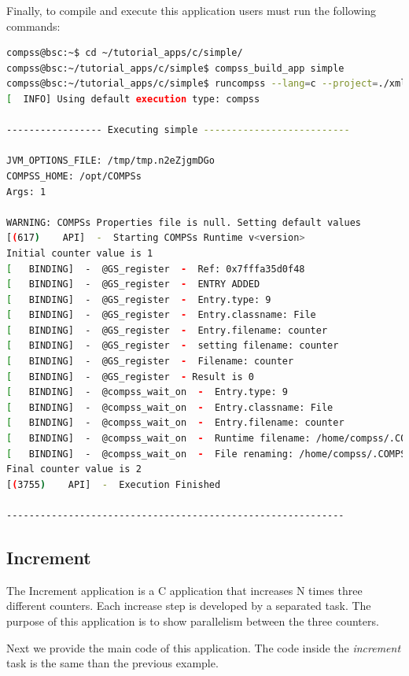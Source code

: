 Finally, to compile and execute this application users must run the following commands:

\begin{lstlisting}[language=bash]
compss@bsc:~$ cd ~/tutorial_apps/c/simple/
compss@bsc:~/tutorial_apps/c/simple$ compss_build_app simple
compss@bsc:~/tutorial_apps/c/simple$ runcompss --lang=c --project=./xml/project.xml --resources=./xml/resources.xml ~/tutorial_apps/c/simple/master/simple 1
[  INFO] Using default execution type: compss

----------------- Executing simple --------------------------

JVM_OPTIONS_FILE: /tmp/tmp.n2eZjgmDGo
COMPSS_HOME: /opt/COMPSs
Args: 1
 
WARNING: COMPSs Properties file is null. Setting default values
[(617)    API]  -  Starting COMPSs Runtime v<version>
Initial counter value is 1
[   BINDING]  -  @GS_register  -  Ref: 0x7fffa35d0f48
[   BINDING]  -  @GS_register  -  ENTRY ADDED
[   BINDING]  -  @GS_register  -  Entry.type: 9
[   BINDING]  -  @GS_register  -  Entry.classname: File
[   BINDING]  -  @GS_register  -  Entry.filename: counter
[   BINDING]  -  @GS_register  -  setting filename: counter
[   BINDING]  -  @GS_register  -  Filename: counter
[   BINDING]  -  @GS_register  - Result is 0
[   BINDING]  -  @compss_wait_on  -  Entry.type: 9
[   BINDING]  -  @compss_wait_on  -  Entry.classname: File
[   BINDING]  -  @compss_wait_on  -  Entry.filename: counter
[   BINDING]  -  @compss_wait_on  -  Runtime filename: /home/compss/.COMPSs/simple_01/tmpFiles/d1v2_1479141705574.IT
[   BINDING]  -  @compss_wait_on  -  File renaming: /home/compss/.COMPSs/simple_01/tmpFiles/d1v2_1479141705574.IT to counter
Final counter value is 2
[(3755)    API]  -  Execution Finished

------------------------------------------------------------
\end{lstlisting}


\subsection{Increment}
The Increment application is a C application that increases N times three different counters. Each increase step is developed by a separated task. The
purpose of this application is to show parallelism between the three counters.

Next we provide the main code of this application. The code inside the \textit{increment} task is the same than the previous example. 

